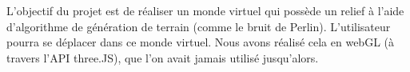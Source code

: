 ﻿L'objectif du projet est de réaliser un monde virtuel qui possède un relief à l'aide d'algorithme de génération de terrain (comme le bruit de Perlin). L'utilisateur pourra se déplacer dans ce monde virtuel. Nous avons réalisé cela en webGL (à travers l'API three.JS), que l'on avait jamais utilisé jusqu'alors.